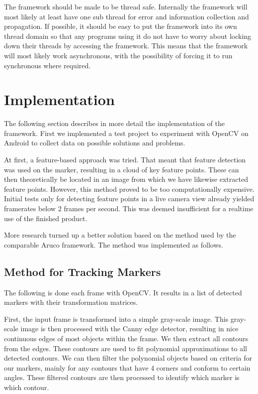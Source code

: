 The framework should be made to be thread safe.
Internally the framework will most likely at least have one sub thread for error and information collection and propagation.
If possible, it should be easy to put the framework into its own thread domain so that any programs using it do not have to worry about locking down their threads by accessing the framework.
This means that the framework will most likely work asynchronous, with the possibility of forcing it to run synchronous where required.

\section{Implementation}

The following section describes in more detail the implementation of the framework.
First we implemented a test project to experiment with OpenCV on Android to collect data on possible solutions and problems.

At first, a feature-based approach was tried.
That meant that feature detection was used on the marker, resulting in a cloud of key feature points.
These can then theoretically be located in an image from which we have likewise extracted feature points.
However, this method proved to be too computationally expensive.
Initial tests only for detecting feature points in a live camera view already yielded framerates below 2 frames per second.
This was deemed insufficient for a realtime use of the finished product.

More research turned up a better solution based on the method used by the comparable Aruco\cite{aruco} framework.
The method was implemented as follows.

\subsection{Method for Tracking Markers}

The following is done each frame with OpenCV.
It results in a list of detected markers with their transformation matrices.

First, the input frame is transformed into a simple gray-scale image.
This gray-scale image is then processed with the Canny\cite{canny} edge detector, resulting in nice continuous edges of most objects within the frame.
We then extract all contours from the edges.
These contours are used to fit polynomial approximations to all detected contours.
We can then filter the polynomial objects based on criteria for our markers, mainly for any contours that have 4 corners and conform to certain angles.
These filtered contours are then processed to identify which marker is which contour.

